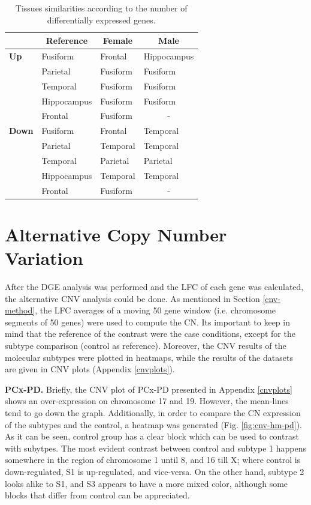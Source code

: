 \begin{table}[!ht]
\centering
\caption{Tissues similarities according to the number of differentially expressed genes.}
\label{tab:eq-tissues}
\begin{tabular}{ll|ll}
\hline
 & \multicolumn{1}{c|}{\textbf{Reference}} & \multicolumn{1}{c}{\textbf{Female}} & \multicolumn{1}{c}{\textbf{Male}} \\ \hline
\textbf{Up}   & Fusiform    & Frontal  & Hippocampus           \\
              & Parietal    & Fusiform & Fusiform              \\
              & Temporal    & Fusiform & Fusiform              \\
              & Hippocampus & Fusiform & Fusiform              \\
              & Frontal     & Fusiform & \multicolumn{1}{c}{-} \\ \hline
\textbf{Down} & Fusiform    & Frontal  & Temporal              \\
              & Parietal    & Temporal & Temporal              \\
              & Temporal    & Parietal & Parietal              \\
              & Hippocampus & Temporal & Temporal              \\
              & Frontal     & Fusiform & \multicolumn{1}{c}{-} \\ \hline
\end{tabular}
\end{table}

\section{Alternative Copy Number Variation}

After the DGE analysis was performed and the LFC of each gene was calculated, the alternative CNV analysis could be done. As mentioned in Section \ref{cnv-method}, the LFC averages of a moving 50 gene window (i.e. chromosome segments of 50 genes) were used to compute the CN. Its important to keep in mind that the reference of the contrast were the case conditions, except for the subtype comparison (control as reference). Moreover, the CNV results of the molecular subtypes were plotted in heatmaps, while the results of the datasets are given in CNV plots (Appendix \ref{cnvplots}).

\sloppy
\textbf{PCx-PD.} Briefly, the CNV plot of PCx-PD presented in Appendix \ref{cnvplots} shows an over-expression on chromosome 17 and 19. However, the mean-lines tend to go down the graph. Additionally, in order to compare the CN expression of the subtypes and the control, a heatmap was generated (Fig. \ref{fig:cnv-hm-pd}). As it can be seen, control group has a clear block which can be used to contrast with subytpes. The most evident contrast between control and subtype 1 happens somewhere in the region of chromosome 1 until 8, and 16 till X; where control is down-regulated, S1 is up-regulated, and vice-versa. On the other hand, subtype 2 looks alike to S1, and S3 appears to have a more mixed color, although some blocks that differ from control can be appreciated.

